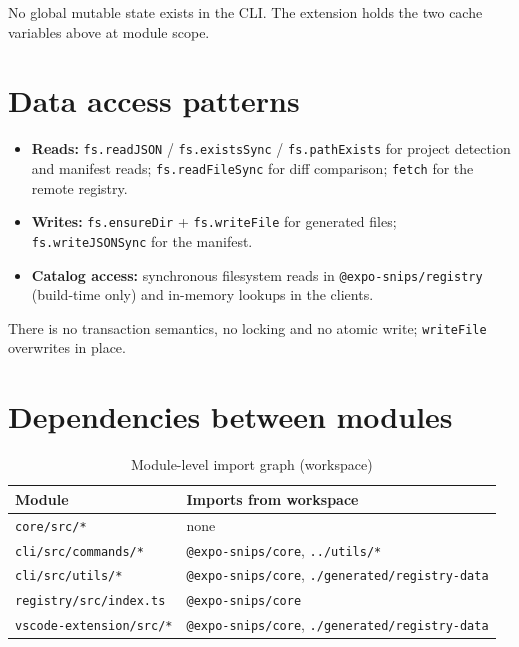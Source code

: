 No global mutable state exists in the CLI. The extension holds the two cache
variables above at module scope.

\section{Data access patterns}

\begin{itemize}
  \item \textbf{Reads:} \texttt{fs.readJSON} / \texttt{fs.existsSync} /
        \texttt{fs.pathExists} for project detection and manifest reads;
        \texttt{fs.readFileSync} for diff comparison; \texttt{fetch} for the remote
        registry.
  \item \textbf{Writes:} \texttt{fs.ensureDir} + \texttt{fs.writeFile} for generated
        files; \texttt{fs.writeJSONSync} for the manifest.
  \item \textbf{Catalog access:} synchronous filesystem reads in
        \texttt{@expo-snips/registry} (build-time only) and in-memory lookups in the
        clients.
\end{itemize}

There is no transaction semantics, no locking and no atomic write;
\texttt{writeFile} overwrites in place.

\section{Dependencies between modules}

\begin{table}[H]
\centering
\caption{Module-level import graph (workspace)}
\begin{tabular}{@{}L{5.4cm}L{8.2cm}@{}}
\toprule
\textbf{Module} & \textbf{Imports from workspace} \\
\midrule
\texttt{core/src/*} & none \\
\texttt{cli/src/commands/*} & \texttt{@expo-snips/core}, \texttt{../utils/*} \\
\texttt{cli/src/utils/*} & \texttt{@expo-snips/core}, \texttt{./generated/registry-data} \\
\texttt{registry/src/index.ts} & \texttt{@expo-snips/core} \\
\texttt{vscode-extension/src/*} & \texttt{@expo-snips/core}, \texttt{./generated/registry-data} \\
\bottomrule
\end{tabular}
\end{table}
